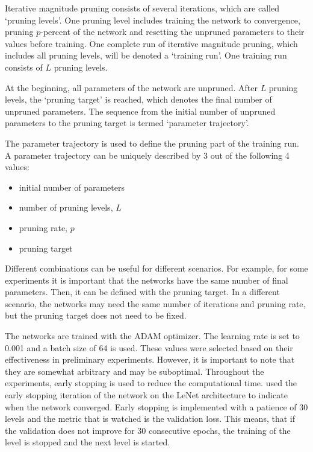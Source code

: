 Iterative magnitude pruning consists of several iterations, which are called `pruning levels'.
One pruning level includes training the network to convergence, pruning $p$-percent of the network and resetting the unpruned parameters to their values before training.
One complete run of iterative magnitude pruning, which includes all pruning levels, will be denoted a `training run'.
One training run consists of $L$ pruning levels.

At the beginning, all parameters of the network are unpruned.
After $L$ pruning levels, the `pruning target' is reached, which denotes the final number of unpruned parameters.
The sequence from the initial number of unpruned parameters to the pruning target is termed `parameter trajectory'.

The parameter trajectory is used to define the pruning part of the training run.
A parameter trajectory can be uniquely described by 3 out of the following 4 values:
\begin{itemize}
    \item initial number of parameters
    \item number of pruning levels, $L$
    \item pruning rate, $p$
    \item pruning target
\end{itemize}

Different combinations can be useful for different scenarios.
For example, for some experiments it is important that the networks have the same number of final parameters.
Then, it can be defined with the pruning target.
In a different scenario, the networks may need the same number of iterations and pruning rate, but the pruning target does not need to be fixed.

The networks are trained with the ADAM optimizer.
The learning rate is set to 0.001 and a batch size of 64 is used.
These values were selected based on their effectiveness in preliminary experiments. 
However, it is important to note that they are somewhat arbitrary and may be suboptimal.
Throughout the experiments, early stopping is used to reduce the computational time.
\textcite{LTH} used the early stopping iteration of the network on the LeNet architecture to indicate when the network converged.
Early stopping is implemented with a patience of 30 levels and the metric that is watched is the validation loss.
This means, that if the validation does not improve for 30 consecutive epochs, the training of the level is stopped and the next level is started.


